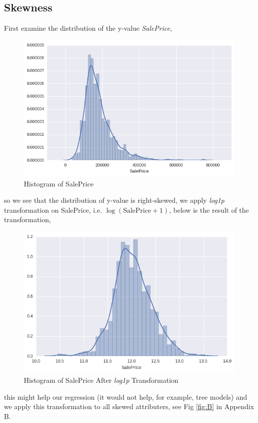 \documentclass[12pt]{article}
\begin{document}
\subsection{Skewness}
First examine the distribution of the y-value \textit{SalePrice}, 
\begin{figure}[h!]
	\centering
	\includegraphics[width=0.6\linewidth]{skew.png}
	\caption{Histogram of SalePrice}
	\label{fig:2}
\end{figure}
so we see that the distribution of y-value is right-skewed, we apply \textit{log1p} transformation on SalePrice, i.e. $\log(\text{SalePrice} + 1)$, below is the result of the transformation,
\begin{figure}[h!]
	\centering
	\includegraphics[width=0.6\linewidth]{skew_after.png}
	\caption{Histogram of SalePrice After \textit{log1p} Transformation}
	\label{fig:3}
\end{figure}
this might help our regression (it would not help, for example, tree models) and we apply this transformation to all skewed attributers, see Fig \ref{fig:B} in Appendix B.
\end{document}
